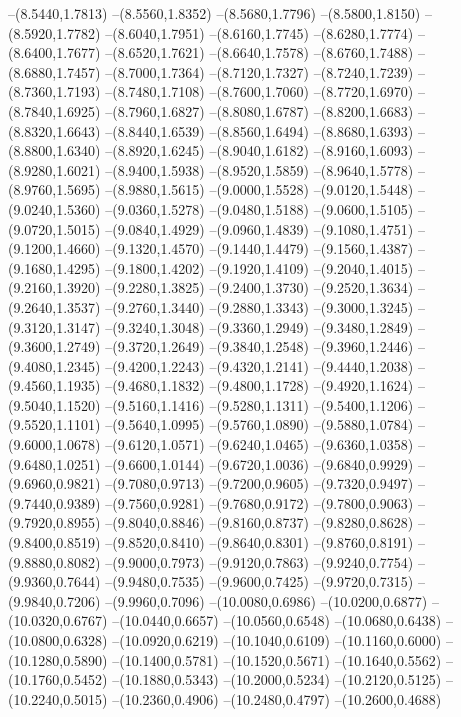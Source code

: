 {\begin{scope}
--(8.5440,1.7813)
--(8.5560,1.8352)
--(8.5680,1.7796)
--(8.5800,1.8150)
--(8.5920,1.7782)
--(8.6040,1.7951)
--(8.6160,1.7745)
--(8.6280,1.7774)
--(8.6400,1.7677)
--(8.6520,1.7621)
--(8.6640,1.7578)
--(8.6760,1.7488)
--(8.6880,1.7457)
--(8.7000,1.7364)
--(8.7120,1.7327)
--(8.7240,1.7239)
--(8.7360,1.7193)
--(8.7480,1.7108)
--(8.7600,1.7060)
--(8.7720,1.6970)
--(8.7840,1.6925)
--(8.7960,1.6827)
--(8.8080,1.6787)
--(8.8200,1.6683)
--(8.8320,1.6643)
--(8.8440,1.6539)
--(8.8560,1.6494)
--(8.8680,1.6393)
--(8.8800,1.6340)
--(8.8920,1.6245)
--(8.9040,1.6182)
--(8.9160,1.6093)
--(8.9280,1.6021)
--(8.9400,1.5938)
--(8.9520,1.5859)
--(8.9640,1.5778)
--(8.9760,1.5695)
--(8.9880,1.5615)
--(9.0000,1.5528)
--(9.0120,1.5448)
--(9.0240,1.5360)
--(9.0360,1.5278)
--(9.0480,1.5188)
--(9.0600,1.5105)
--(9.0720,1.5015)
--(9.0840,1.4929)
--(9.0960,1.4839)
--(9.1080,1.4751)
--(9.1200,1.4660)
--(9.1320,1.4570)
--(9.1440,1.4479)
--(9.1560,1.4387)
--(9.1680,1.4295)
--(9.1800,1.4202)
--(9.1920,1.4109)
--(9.2040,1.4015)
--(9.2160,1.3920)
--(9.2280,1.3825)
--(9.2400,1.3730)
--(9.2520,1.3634)
--(9.2640,1.3537)
--(9.2760,1.3440)
--(9.2880,1.3343)
--(9.3000,1.3245)
--(9.3120,1.3147)
--(9.3240,1.3048)
--(9.3360,1.2949)
--(9.3480,1.2849)
--(9.3600,1.2749)
--(9.3720,1.2649)
--(9.3840,1.2548)
--(9.3960,1.2446)
--(9.4080,1.2345)
--(9.4200,1.2243)
--(9.4320,1.2141)
--(9.4440,1.2038)
--(9.4560,1.1935)
--(9.4680,1.1832)
--(9.4800,1.1728)
--(9.4920,1.1624)
--(9.5040,1.1520)
--(9.5160,1.1416)
--(9.5280,1.1311)
--(9.5400,1.1206)
--(9.5520,1.1101)
--(9.5640,1.0995)
--(9.5760,1.0890)
--(9.5880,1.0784)
--(9.6000,1.0678)
--(9.6120,1.0571)
--(9.6240,1.0465)
--(9.6360,1.0358)
--(9.6480,1.0251)
--(9.6600,1.0144)
--(9.6720,1.0036)
--(9.6840,0.9929)
--(9.6960,0.9821)
--(9.7080,0.9713)
--(9.7200,0.9605)
--(9.7320,0.9497)
--(9.7440,0.9389)
--(9.7560,0.9281)
--(9.7680,0.9172)
--(9.7800,0.9063)
--(9.7920,0.8955)
--(9.8040,0.8846)
--(9.8160,0.8737)
--(9.8280,0.8628)
--(9.8400,0.8519)
--(9.8520,0.8410)
--(9.8640,0.8301)
--(9.8760,0.8191)
--(9.8880,0.8082)
--(9.9000,0.7973)
--(9.9120,0.7863)
--(9.9240,0.7754)
--(9.9360,0.7644)
--(9.9480,0.7535)
--(9.9600,0.7425)
--(9.9720,0.7315)
--(9.9840,0.7206)
--(9.9960,0.7096)
--(10.0080,0.6986)
--(10.0200,0.6877)
--(10.0320,0.6767)
--(10.0440,0.6657)
--(10.0560,0.6548)
--(10.0680,0.6438)
--(10.0800,0.6328)
--(10.0920,0.6219)
--(10.1040,0.6109)
--(10.1160,0.6000)
--(10.1280,0.5890)
--(10.1400,0.5781)
--(10.1520,0.5671)
--(10.1640,0.5562)
--(10.1760,0.5452)
--(10.1880,0.5343)
--(10.2000,0.5234)
--(10.2120,0.5125)
--(10.2240,0.5015)
--(10.2360,0.4906)
--(10.2480,0.4797)
--(10.2600,0.4688)

\end{scope}}
